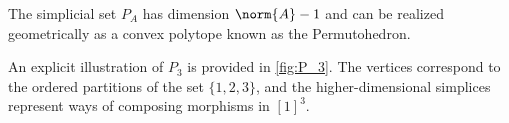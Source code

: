 The simplicial set $P_A$ has dimension $\norm{A} - 1$ and can be realized geometrically as a convex polytope known as the Permutohedron.

\begin{exmp}
An explicit illustration of $P_3$ is provided in \cref{fig:P_3}. The vertices correspond to the ordered partitions of the set $\{1,2,3\}$, and the higher-dimensional simplices represent ways of composing morphisms in $[1]^3$.
\end{exmp}


